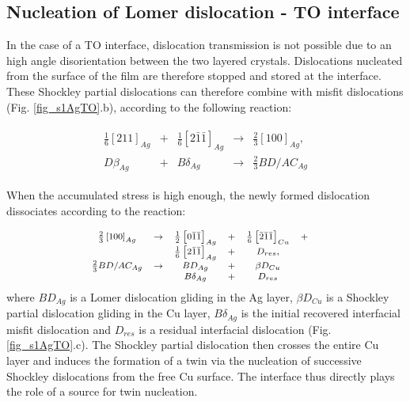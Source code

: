 \documentclass[final,3p,times,twocolumn]{elsarticle}
\begin{document}
	\subsection{Nucleation of Lomer dislocation - TO interface}
	\label{subsubpart_lomer}
	
In the case of a TO interface, dislocation transmission is not possible due to an high angle disorientation between the two layered crystals. Dislocations nucleated from the surface of the film are therefore stopped and stored at the interface. These Shockley partial dislocations can therefore combine with misfit dislocations (Fig. \ref{fig_s1AgTO}.b), according to the following reaction:

\begin{eqnarray}\label{2}
	\begin{array}{ccccccccccccc}
\frac{1}{6}\left[211\right]_{Ag} &+& \frac{1}{6}\left[2\bar{1}\bar{1}\right]_{Ag} &\rightarrow& \frac{2}{3}\left[100\right]_{Ag},\\
D\beta_{Ag} &+& B\delta_{Ag} &\rightarrow& \frac{2}{3}BD/AC_{Ag} 
	\end{array}
\end{eqnarray}

When the accumulated stress is high enough, the newly formed dislocation dissociates according to the reaction:

\begin{eqnarray}\label{3}
	\begin{footnotesize}
	\begin{array}{cccccccc}
\frac{2}{3}\left[100\right]_{Ag} &\rightarrow& \frac{1}{2}\left[0\bar{1}\bar{1}\right]_{Ag} &+& \frac{1}{6}\left[\bar{2}\bar{1}\bar{1}\right]_{Cu}  &+& \\
 & & \frac{1}{6}\left[2\bar{1}\bar{1}\right]_{Ag} &+& D_{res}, \\
\frac{2}{3}BD/AC_{Ag} &\rightarrow& BD_{Ag} &+& \beta D_{Cu} \\
 & & B\delta_{Ag} &+& D_{res}
	\end{array}
 	\end{footnotesize}
\end{eqnarray}
where $BD_{Ag}$ is a Lomer dislocation gliding in the Ag layer, $\beta D_{Cu}$ is a Shockley partial dislocation gliding in the Cu layer, $B\delta_{Ag}$ is the initial recovered interfacial misfit dislocation and $D_{res}$ is a residual interfacial dislocation (Fig. \ref{fig_s1AgTO}.c). The Shockley partial dislocation then crosses the entire Cu layer and induces the formation of a twin via the nucleation of successive Shockley dislocations from the free Cu surface. The interface thus directly plays the role of a source for twin nucleation. 
\end{document}
